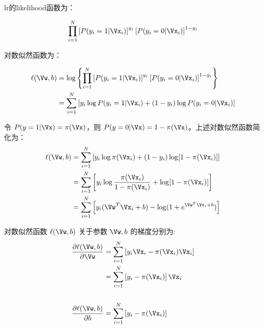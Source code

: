 \gls{lr}的\gls{likelihood}函数为：

\begin{equation}
	\prod_{i = 1}^N \left[P(y_i = 1 | \Vx_i)\right]^{y_i} \left[P(y_i = 0 | \Vx_i)\right]^{1 - y_i} 
\end{equation}

对数似然函数为：

\begin{align}
	\ell(\Vw, b) &= \log\left\{\prod_{i = 1}^N \left[P(y_i = 1 | \Vx_i)\right]^{y_i} \left[P(y_i = 0 | \Vx_i)\right]^{1 - y_i} \right\} \nonumber \\
	             &= \sum\limits_{i=1}^N\left[y_i\log P(y_i = 1 | \Vx_i)+(1-y_i)\log P(y_i = 0 | \Vx_i)\right] \nonumber 
\end{align}

令 $ P(y=1|\Vx) = \pi(\Vx) $，则 $ P(y=0|\Vx) = 1 - \pi(\Vx) $。上述对数似然函数简化为：
\begin{align}
	\ell(\Vw, b) &= \sum\limits_{i=1}^N \left[
					y_i\log \pi(\Vx_i) + (1-y_i)\log[1-\pi(\Vx_i)]
					\right] \nonumber \\
	             &= \sum\limits_{i=1}^N \left[
	             	y_i \log \frac{\pi(\Vx_i)}{1-\pi(\Vx_i)} + \log[1-\pi(\Vx_i)]
	             	\right] \nonumber \\
	             &= \sum\limits_{i=1}^N \left[
	             	y_i (\Vw^T\Vx_i+b) - \log (1 + e^{\Vw^T\Vx_i+b})
	             	\right]
\end{align}


对数似然函数 $ \ell(\Vw, b) $ 关于参数 $ \Vw, b $ 的梯度分别为:
\begin{align}
	\frac{\partial \ell(\Vw, b)}{\partial \Vw} &= \sum \limits_{i=1}^N \left[
		                                          y_i \Vx_i - \pi(\Vx_i) \Vx_i
		                                          \right]  \nonumber \\
		                                       &= \sum \limits_{i=1}^N \left[
		                                          y_i - \pi(\Vx_i) \right] \Vx_i \\ \nonumber \\
	\frac{\partial \ell(\Vw, b)}{\partial b} &= \sum \limits_{i=1}^N \left[
		                                          y_i - \pi(\Vx_i)
		                                          \right]
\end{align}












